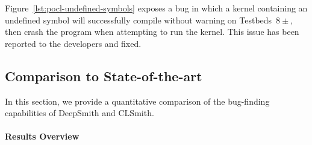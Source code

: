 Figure~\ref{lst:pocl-undefined-symbols} exposes a bug in which a kernel
containing an undefined symbol will successfully compile without warning on
Testbeds~$8\pm$, then crash the program when attempting to run the kernel. This
issue has been reported to the developers and fixed.

\subsection{Comparison to State-of-the-art}%
\label{subsec:vs_clsmith}

In this section, we provide a quantitative comparison of the bug-finding
capabilities of DeepSmith and CLSmith.

\paragraph{Results Overview}

\begin{table}
  \scriptsize %
  \centering %
  \caption{%
  Results from 48 hours of testing using CLSmith and DeepSmith. System \#. as
  per Table~\ref{tab:platforms}. $\pm$ denotes optimizations off ($-$) vs on
  ($+$). The remaining columns denote the number of build crash (\bc), build
  timeout (\bto), anomalous build failure (\abf), anomalous runtime crash
  (\arc), anomalous wrong-output (\awo), and pass (\textbf{\cmark}) results.
  \vspace{-1.1em}
  }
  
  \vspace{-1.1em}
  \label{tab:megatable}
\end{table}

